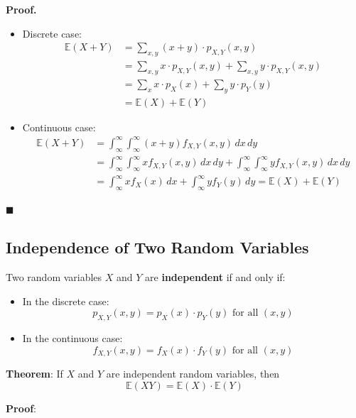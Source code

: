 \documentclass[twoside]{book}
\begin{document}
\textbf{Proof.}
\begin{itemize}
  \item Discrete case:
  \begin{align*}
  \mathbb{E}(X + Y) &= \sum_{x, y} (x + y) \cdot p_{X,Y}(x,y)\\
  &= \sum_{x, y} x \cdot p_{X,Y}(x,y) + \sum_{x, y} y \cdot p_{X,Y}(x,y)\\
  &= \sum_{x} x \cdot p_X(x) + \sum_{y} y \cdot p_Y(y)\\
  &= \mathbb{E}(X) + \mathbb{E}(Y)
  \end{align*}

  \item Continuous case:
  \begin{align*}
    \mathbb{E}(X + Y) &= \int_{\infty}^{\infty}\int_{\infty}^{\infty} (x + y) f_{X,Y}(x, y) \, dx \, dy \\
  &= \int_{\infty}^{\infty}\int_{\infty}^{\infty} x f_{X,Y}(x, y) \, dx \, dy + \int_{\infty}^{\infty}\int_{\infty}^{\infty} y f_{X,Y}(x, y) \, dx \, dy \\
  &= \int_{\infty}^{\infty} x f_X(x) \, dx + \int_{\infty}^{\infty} y f_Y(y) \, dy = \mathbb{E}(X) + \mathbb{E}(Y)
  \end{align*}
\end{itemize}
\hfill\(\blacksquare\)

\subsection{Independence of Two Random Variables}

Two random variables \( X \) and \( Y \) are \textbf{independent} if and only if:
\begin{itemize}
  \item In the discrete case: $$p_{X,Y}(x, y) = p_X(x) \cdot p_Y(y) \text{ for all } ( x, y )$$
  \item In the continuous case: $$f_{X,Y}(x, y) = f_X(x) \cdot f_Y(y) \text{ for all } ( x, y )$$
\end{itemize}

\begin{textbox}
\textbf{Theorem}: If \( X \) and \( Y \) are independent random variables, then
\[
\mathbb{E}(XY) = \mathbb{E}(X) \cdot \mathbb{E}(Y)
\]
\end{textbox}

\textbf{Proof}:
\end{document}
